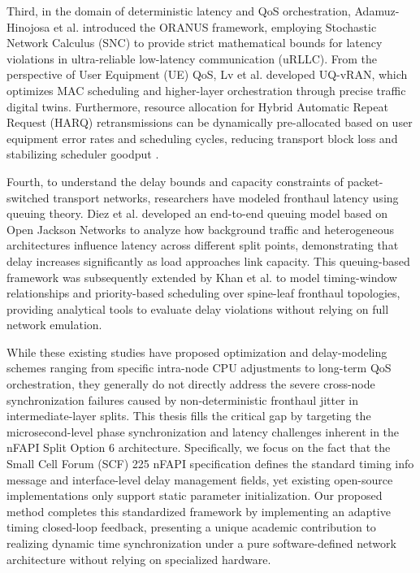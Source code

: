 \documentclass[../my_ntust_thesis.tex]{subfiles}
\begin{document}
Third, in the domain of deterministic latency and QoS orchestration, Adamuz-Hinojosa et al. \cite{Adamuz2024ORANUS} introduced the ORANUS framework, employing Stochastic Network Calculus (SNC) to provide strict mathematical bounds for latency violations in ultra-reliable low-latency communication (uRLLC). From the perspective of User Equipment (UE) QoS, Lv et al. \cite{Lv2024QoS} developed UQ-vRAN, which optimizes MAC scheduling and higher-layer orchestration through precise traffic digital twins. Furthermore, resource allocation for Hybrid Automatic Repeat Request (HARQ) retransmissions can be dynamically pre-allocated based on user equipment error rates and scheduling cycles, reducing transport block loss and stabilizing scheduler goodput \cite{elfiky2024allocation}.

Fourth, to understand the delay bounds and capacity constraints of packet-switched transport networks, researchers have modeled fronthaul latency using queuing theory. Diez et al. \cite{diez2021flexible} developed an end-to-end queuing model based on Open Jackson Networks to analyze how background traffic and heterogeneous architectures influence latency across different split points, demonstrating that delay increases significantly as load approaches link capacity. This queuing-based framework was subsequently extended by Khan et al. \cite{khan2026evaluating} to model timing-window relationships and priority-based scheduling over spine-leaf fronthaul topologies, providing analytical tools to evaluate delay violations without relying on full network emulation.

While these existing studies \cite{Lee2022, jia2024aquifer, Adamuz2024ORANUS, Lv2024QoS, elfiky2024allocation, hidalgo2025aegisran, diez2021flexible, khan2026evaluating, Mohammed2026Fronthaul} have proposed optimization and delay-modeling schemes ranging from specific intra-node CPU adjustments to long-term QoS orchestration, they generally do not directly address the severe cross-node synchronization failures caused by non-deterministic fronthaul jitter in intermediate-layer splits. This thesis fills the critical gap by targeting the microsecond-level phase synchronization and latency challenges inherent in the nFAPI Split Option 6 architecture. Specifically, we focus on the fact that the Small Cell Forum (SCF) 225 nFAPI specification \cite{SCF225} defines the standard timing info message and interface-level delay management fields, yet existing open-source implementations only support static parameter initialization. Our proposed method completes this standardized framework by implementing an adaptive timing closed-loop feedback, presenting a unique academic contribution to realizing dynamic time synchronization under a pure software-defined network architecture without relying on specialized hardware.
\end{document}
